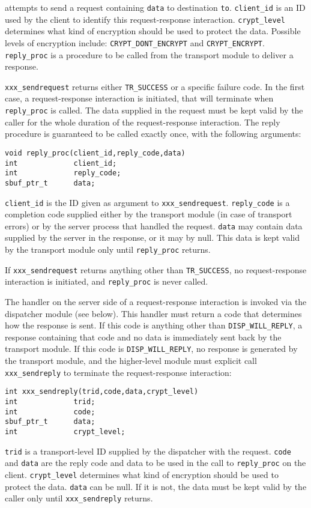 attempts to send a request containing \verb"data" to destination
\verb"to". \verb"client_id" is an ID used by the client to identify
this request-response interaction. \verb"crypt_level" determines what
kind of encryption should be used to protect the data.  Possible
levels of encryption include: \verb"CRYPT_DONT_ENCRYPT" and
\verb"CRYPT_ENCRYPT". \verb"reply_proc" is a procedure to be called
from the transport module to deliver a response.

\verb"xxx_sendrequest" returns either \verb"TR_SUCCESS" or a specific failure
code. In the first case, a request-response interaction is initiated,
that will terminate when \verb"reply_proc" is called. The data
supplied in the request must be kept valid by the caller for the whole
duration of the request-response interaction.  The reply procedure is
guaranteed to be called exactly once, with the following arguments:
\begin{verbatim}
void reply_proc(client_id,reply_code,data)
int             client_id;
int             reply_code;
sbuf_ptr_t      data;
\end{verbatim}
\verb"client_id" is the ID given as argument to
\verb"xxx_sendrequest". \verb"reply_code" is a completion code
supplied either by the transport module (in case of transport errors)
or by the server process that handled the request. \verb"data" may
contain data supplied by the server in the response, or it may by
null. This data is kept valid by the transport module only until
\verb"reply_proc" returns.

If \verb"xxx_sendrequest" returns anything other than \verb"TR_SUCCESS", no
request-response interaction is initiated, and \verb"reply_proc" is
never called. 

The handler on the server side of a request-response interaction is
invoked via the dispatcher module (see below). This handler must
return a code that determines how the response is sent. If this code
is anything other than \verb"DISP_WILL_REPLY", a response containing that
code and no data is immediately sent back by the transport module. If
this code is \verb"DISP_WILL_REPLY", no response is generated by the
transport module, and the higher-level module must explicit call
\verb"xxx_sendreply" to terminate the request-response interaction:
\begin{verbatim}
int xxx_sendreply(trid,code,data,crypt_level)
int             trid;
int             code;
sbuf_ptr_t      data;
int             crypt_level;
\end{verbatim}
\verb"trid" is a transport-level ID supplied by the dispatcher with
the request. \verb"code" and \verb"data" are the reply code and data
to be used in the call to \verb"reply_proc" on the client.
\verb"crypt_level" determines what kind of encryption should be used
to protect the data. \verb"data" can be null. If it is not, the data
must be kept valid by the caller only until \verb"xxx_sendreply"
returns. 

